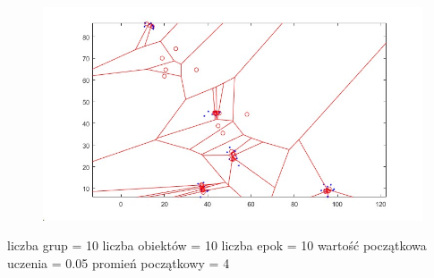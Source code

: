 \documentclass[11pt]{article}
\begin{document}
\begin{figure}[h!]
  \includegraphics{screeny/WTM_seq/WTM_seq_5_groups/WTM_seq_Areas.jpg}
\end{figure}

liczba grup = 10 liczba obiektów = 10 liczba epok = 10 wartość
początkowa uczenia = 0.05 promień początkowy = 4
\end{document}
